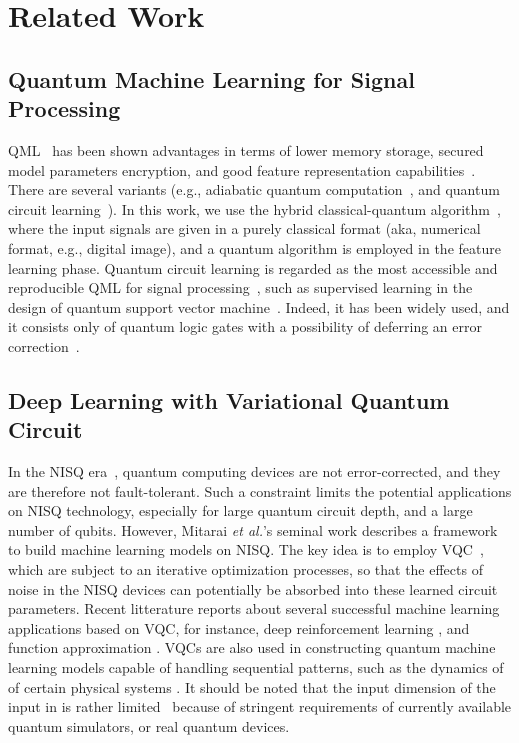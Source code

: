 \documentclass{article}
\begin{document}
\section{Related Work}
\label{sec:rw}
\subsection{Quantum Machine Learning for Signal Processing} 
QML~\cite{mitarai2018quantum} has been shown advantages in terms of lower memory storage, secured model parameters encryption, and good feature representation capabilities~\cite{havlivcek2019supervised}. There are several variants (e.g., adiabatic quantum computation~\cite{farhi2000quantum}, and quantum circuit learning~\cite{yao1993quantum}). In this work, we use the hybrid classical-quantum algorithm~\cite{henderson2020quanvolutional}, where the input signals are given in a purely classical format (aka, numerical format, e.g., digital image), and a quantum algorithm is employed in the feature learning phase. Quantum circuit learning is regarded as the most accessible and reproducible QML for signal processing~\cite{biamonte2017quantum}, such as supervised learning in the design of quantum support vector machine~\cite{havlivcek2019supervised}.
Indeed, it has been widely used, and it consists only of quantum logic gates with a possibility of deferring an error correction~\cite{mitarai2018quantum, yao1993quantum}. 

\subsection{Deep Learning with Variational Quantum Circuit}
In the NISQ era~\cite{preskill2018quantum}, quantum computing devices are not error-corrected, and they are therefore not fault-tolerant. Such a constraint limits the potential applications on NISQ technology, especially for large quantum circuit depth, and a large number of qubits. However,  Mitarai \emph{et al.}'s seminal work \cite{mitarai2018quantum} describes a framework to build machine learning models on NISQ. The key idea is to employ VQC~\cite{benedetti2019parameterized}, which are subject to an iterative optimization processes, so that the effects of noise in the NISQ devices can potentially be absorbed into these learned circuit parameters. Recent litterature reports about several successful machine learning applications based on VQC, for instance, deep reinforcement learning \cite{chen2020variational}, and function approximation  \cite{mitarai2018quantum}. VQCs are also used in constructing quantum machine learning models capable of handling sequential patterns, such as the dynamics of of certain physical systems \cite{chen2020quantum}. It should be noted that the input dimension of the input  in \cite{chen2020quantum} is rather limited~\cite{chen2020variational} because of stringent requirements of currently available quantum simulators, or real quantum devices.
\end{document}
